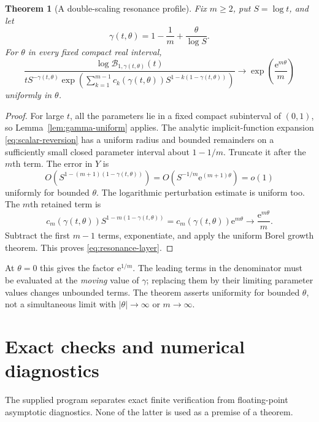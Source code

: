 \documentclass[11pt,a4paper]{article}
\numberwithin{equation}{section}
\newtheorem{theorem}{Theorem}[section]
\theoremstyle{definition}
\theoremstyle{remark}
\newcommand{\Bcal}{\mathcal B}
\newcommand{\ee}{\mathrm e}
\begin{document}
\begin{theorem}[A double-scaling resonance profile]
\label{thm:resonance-layer}
Fix $m\ge2$, put $S=\log t$, and let
\begin{equation}
 \gamma(t,\theta)=1-\frac1m+\frac{\theta}{\log S}.
 \label{eq:moving-gamma}
\end{equation}
For $\theta$ in every fixed compact real interval,
\begin{equation}
 \frac{\log\Bcal_{1,\gamma(t,\theta)}(t)}
 {tS^{-\gamma(t,\theta)}
  \exp\!\left(\sum_{k=1}^{m-1}c_k(\gamma(t,\theta))
         S^{1-k(1-\gamma(t,\theta))}\right)}
 \longrightarrow \exp\left(\frac{\ee^{m\theta}}m\right)
 \label{eq:resonance-layer}
\end{equation}
uniformly in $\theta$.
\end{theorem}
\begin{proof}
For large $t$, all the parameters lie in a fixed compact subinterval
of $(0,1)$, so Lemma~\ref{lem:gamma-uniform} applies. The analytic
implicit-function expansion \eqref{eq:scalar-reversion} has a uniform
radius and bounded remainders on a sufficiently small closed parameter
interval about $1-1/m$. Truncate it after the $m$th term. The error in
$Y$ is
\[
 O\!\left(S^{1-(m+1)(1-\gamma(t,\theta))}\right)
 =O\!\left(S^{-1/m}\ee^{(m+1)\theta}\right)=o(1)
\]
uniformly for bounded $\theta$. The logarithmic perturbation estimate
is uniform too. The $m$th retained term is
\[
 c_m(\gamma(t,\theta))S^{1-m(1-\gamma(t,\theta))}
 =c_m(\gamma(t,\theta))\ee^{m\theta}
 \longrightarrow\frac{\ee^{m\theta}}m.
\]
Subtract the first $m-1$ terms, exponentiate, and apply the uniform Borel
growth theorem. This proves \eqref{eq:resonance-layer}.
\end{proof}

At $\theta=0$ this gives the factor $\ee^{1/m}$. The leading terms in
the denominator must be evaluated at the \emph{moving} value of
$\gamma$; replacing them by their limiting parameter values changes
unbounded terms. The theorem asserts uniformity for bounded $\theta$,
not a simultaneous limit with $|\theta|\to\infty$ or $m\to\infty$.

\section{Exact checks and numerical diagnostics}
\label{sec:computations}

The supplied program separates exact finite verification from
floating-point asymptotic diagnostics. None of the latter is used as a
premise of a theorem.
\end{document}
